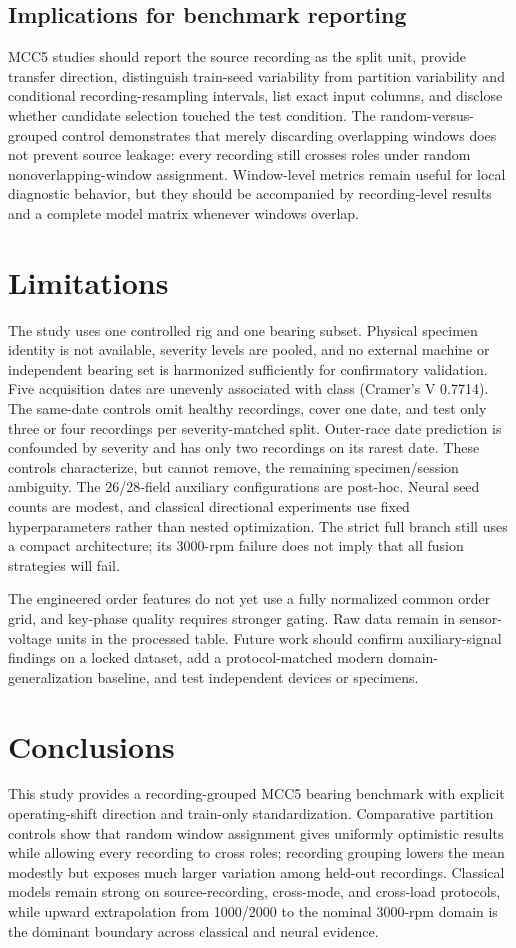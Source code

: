 \documentclass[11pt]{article}
\begin{document}
\subsection{Implications for benchmark reporting}
MCC5 studies should report the source recording as the split unit, provide transfer direction, distinguish train-seed variability from partition variability and conditional recording-resampling intervals, list exact input columns, and disclose whether candidate selection touched the test condition. The random-versus-grouped control demonstrates that merely discarding overlapping windows does not prevent source leakage: every recording still crosses roles under random nonoverlapping-window assignment. Window-level metrics remain useful for local diagnostic behavior, but they should be accompanied by recording-level results and a complete model matrix whenever windows overlap.

\section{Limitations}
The study uses one controlled rig and one bearing subset. Physical specimen identity is not available, severity levels are pooled, and no external machine or independent bearing set is harmonized sufficiently for confirmatory validation. Five acquisition dates are unevenly associated with class (Cramer's V 0.7714). The same-date controls omit healthy recordings, cover one date, and test only three or four recordings per severity-matched split. Outer-race date prediction is confounded by severity and has only two recordings on its rarest date. These controls characterize, but cannot remove, the remaining specimen/session ambiguity. The 26/28-field auxiliary configurations are post-hoc. Neural seed counts are modest, and classical directional experiments use fixed hyperparameters rather than nested optimization. The strict full branch still uses a compact architecture; its 3000-rpm failure does not imply that all fusion strategies will fail.

The engineered order features do not yet use a fully normalized common order grid, and key-phase quality requires stronger gating. Raw data remain in sensor-voltage units in the processed table. Future work should confirm auxiliary-signal findings on a locked dataset, add a protocol-matched modern domain-generalization baseline, and test independent devices or specimens.

\section{Conclusions}
This study provides a recording-grouped MCC5 bearing benchmark with explicit operating-shift direction and train-only standardization. Comparative partition controls show that random window assignment gives uniformly optimistic results while allowing every recording to cross roles; recording grouping lowers the mean modestly but exposes much larger variation among held-out recordings. Classical models remain strong on source-recording, cross-mode, and cross-load protocols, while upward extrapolation from 1000/2000 to the nominal 3000-rpm domain is the dominant boundary across classical and neural evidence.
\end{document}
